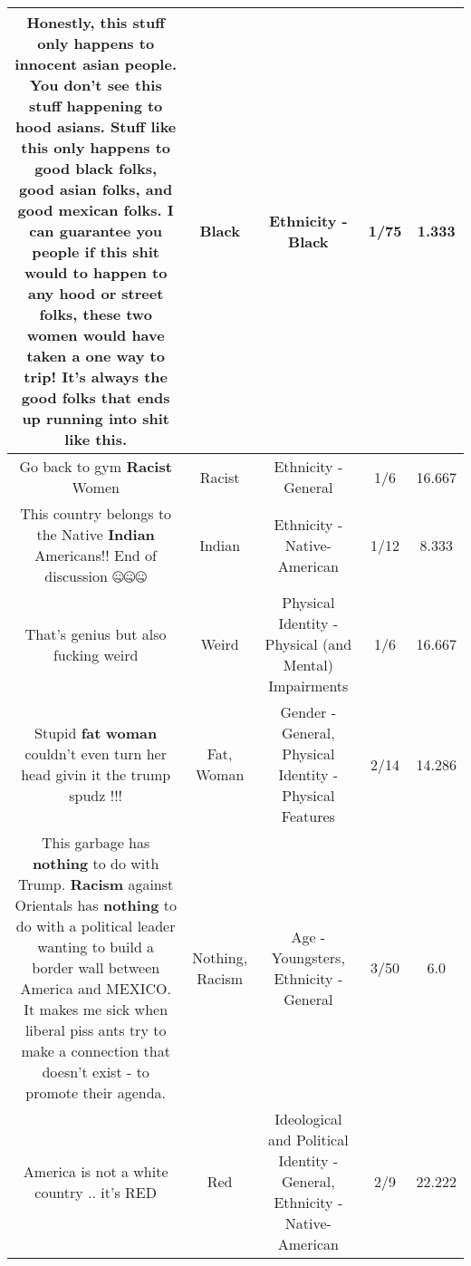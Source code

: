 \documentclass[11pt]{article}
\newlength\mylength
\begin{document}
\begin{center}
\begin{longtable}{|C{.65\mylength}|C{.30\mylength}|C{.12\mylength}|C{.12\mylength}|C{.12\mylength}|}
  \small Honestly, this stuff only happens to innocent asian people. You don't see this stuff happening to hood asians. Stuff like this only happens to good \textbf{black} folks, good asian folks, and good mexican folks. I can guarantee you people if this shit would to happen to any hood or street folks, these two women would have taken a one way to trip! It's always the good folks that ends up running into shit like this.\normalsize   & Black & Ethnicity - Black & 1/75 & 1.333 \\  \hline
  \small Go back to gym \textbf{Racist} Women\normalsize   & Racist & Ethnicity - General & 1/6 & 16.667 \\  \hline
  \small This country belongs to the Native \textbf{Indian} Americans!! End of discussion 🤐🤐🤐\normalsize   & Indian & Ethnicity - Native-American & 1/12 & 8.333 \\  \hline
  \small That's genius but also fucking weird\normalsize   & Weird & Physical Identity - Physical (and Mental) Impairments & 1/6 & 16.667 \\  \hline
  \small Stupid \textbf{fat} \textbf{woman} couldn't even turn her head givin it the trump spudz !!!\normalsize   & Fat, Woman & Gender - General, Physical Identity - Physical Features & 2/14 & 14.286 \\  \hline
  \small This garbage has \textbf{nothing} to do with Trump.  \textbf{Racism} against Orientals has \textbf{nothing} to do with a political leader wanting to build a border wall between America and MEXICO.  It makes me sick when liberal piss ants try to make a connection that doesn't exist - to promote their agenda.\normalsize   & Nothing, Racism & Age - Youngsters, Ethnicity - General & 3/50 & 6.0 \\  \hline
  \small America is not a white country .. it's RED\normalsize   & Red &  Ideological and Political Identity - General, Ethnicity - Native-American & 2/9 & 22.222 \\  \hline

\end{longtable}
\end{center}
\end{document}

